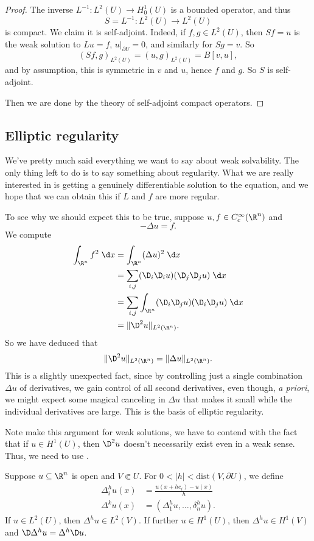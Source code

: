 \documentclass[a4paper]{article}
\begin{document}
\begin{proof}
  The inverse $L^{-1}: L^2(U) \to H_0^1(U)$ is a bounded operator, and thus
  \[
    S = L^{-1}: L^2(U) \to L^2(U)
  \]
  is compact. We claim it is self-adjoint. Indeed, if $f, g \in L^2(U)$, then $Sf = u$ is the weak solution to $Lu = f$, $u|_{\partial U} = 0$, and similarly for $Sg = v$. So
  \[
    (Sf, g)_{L^2(U)} = (u, g)_{L^2(U)} = B[v, u],
  \]
  and by assumption, this is symmetric in $v$ and $u$, hence $f$ and $g$. So $S$ is self-adjoint.

  Then we are done by the theory of self-adjoint compact operators.
\end{proof}

\subsection{Elliptic regularity}
We've pretty much said everything we want to say about weak solvability. The only thing left to do is to say something about regularity. What we are really interested in is getting a genuinely differentiable solution to the equation, and we hope that we can obtain this if $L$ and $f$ are more regular.

To see why we should expect this to be true, suppose $u, f \in C_c^\infty(\R^n)$ and 
\[
  -\Delta u = f.
\]
We compute
\begin{align*}
  \int_{\R^n} f^2 \;\d x &= \int_{\R^n} (\Delta u)^2\;\d x \\
  &= \sum_{i, j} (\D_i \D_i u)(\D_j \D_j u)\;\d x\\
  &= \sum_{i ,j} \int_{\R^n} (\D_i \D_j u) (\D_i \D_j u) \;\d x\\
  &= \|\D^2 u\|_{L^2(\R^n)}.
\end{align*}
So we have deduced that
\[
  \|\D^2 u\|_{L^2(\R^n)} = \| \Delta u\|_{L^2(\R^n)}.
\]
This is a slightly unexpected fact, since by controlling just a single combination $\Delta u$ of derivatives, we gain control of all second derivatives, even though, \emph{a priori}, we might expect some magical canceling in $\Delta u$ that makes it small while the individual derivatives are large. This is the basis of elliptic regularity.

Note make this argument for weak solutions, we have to contend with the fact that if $u \in H^1(U)$, then $\D^2 u$ doesn't necessarily exist even in a weak sense. Thus, we need to use .

Suppose $u \subseteq \R^n$ is open and $V \Subset U$. For $0 < |h| < \mathrm{dist}(V, \partial U)$, we define
\begin{align*}
  \Delta_i^h u(x) &= \frac{u(x + h e_i) - u(x)}{h}\\
  \Delta^k u(x) &= (\Delta_1^h u, \ldots, \delta^h_n u).
\end{align*}
If $u \in L^2(U)$, then $\Delta^h u \in L^2(V)$. If further $u \in H^1(U)$, then $\Delta^h u \in H^1(V)$ and $\D \Delta^h u = \Delta^h \D u$.
\end{document}
